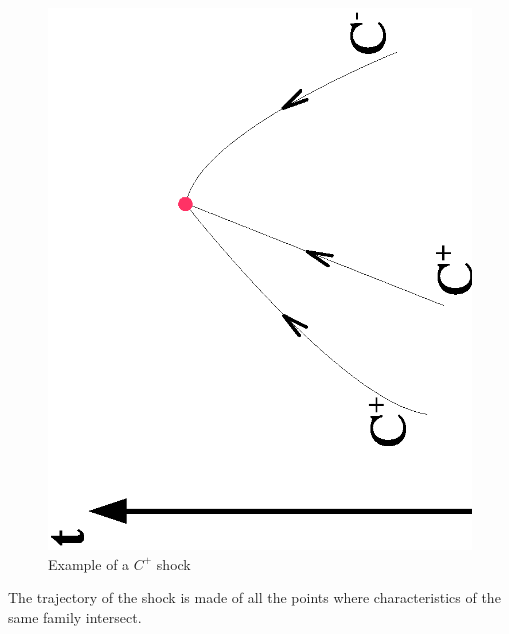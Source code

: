 \begin{figure}
 \begin{center}
  \includegraphics[scale=0.5,angle=270]{Figures/3Carac.eps} \hspace{2cm}
  \vspace{1.cm}
  \caption{Example of a $C^+$ shock}
 \end{center}
\end{figure}

\vspace{0.5cm}

The trajectory of the shock is made of all the points where characteristics of the same family intersect.

